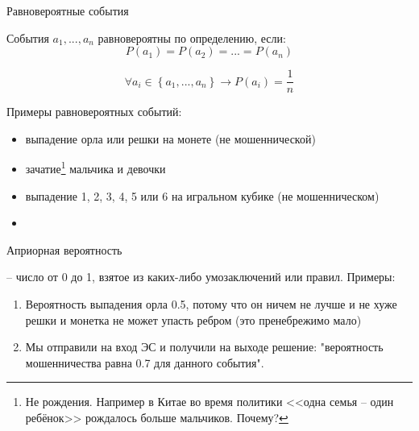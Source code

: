 \begin{frame}{Равновероятные события}
\small

События  $a_1, ..., a_n$ равновероятны по определению, если:
\begin{equation}
   P(a_1) = P(a_2) = ... = P(a_n)
\end{equation}

\begin{equation}
 \forall a_i \in \left\{a_1, ..., a_n \right\} \rightarrow P(a_i) = \frac{1}{n}
\end{equation}

Примеры равновероятных событий:
\begin{itemize}
	\item выпадение орла или решки на монете (не мошеннической)
	\item зачатие\footnote{Не рождения. Например в Китае во время политики <<одна семья -- один ребёнок>> рождалось больше мальчиков. Почему?} мальчика и девочки
	\item выпадение 1, 2, 3, 4, 5 или 6 на игральном кубике (не мошенническом)
	\item {}
\end{itemize}

\end{frame}

\begin{frame}{Априорная вероятность}
	
	 -- число от 0 до 1, взятое из каких-либо умозаключений или правил.
	Примеры:
	\begin{enumerate}
		\item Вероятность выпадения орла 0.5, потому что он ничем не лучше и не хуже решки и монетка не может упасть ребром (это пренебрежимо мало)
		\item Мы отправили  на вход ЭС и получили на выходе решение: "вероятность мошенничества равна 0.7 для данного события".
	\end{enumerate}
	
\end{frame}

